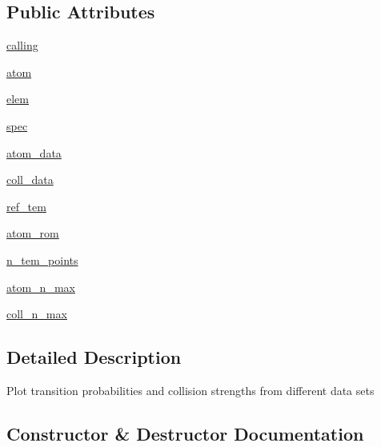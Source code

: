 \subsection*{Public Attributes}
\begin{DoxyCompactItemize}
\item 
\hyperlink{classpyneb_1_1plot_1_1plot_atomic_data_1_1_data_plot_ab25fa7ebe84b603684dee62410c1e34c}{calling}
\item 
\hyperlink{classpyneb_1_1plot_1_1plot_atomic_data_1_1_data_plot_a0c5c7091b1d8a95d9bee2744d713f5c9}{atom}
\item 
\hyperlink{classpyneb_1_1plot_1_1plot_atomic_data_1_1_data_plot_a62e73dc66c7aff7941c5ce94e808c23a}{elem}
\item 
\hyperlink{classpyneb_1_1plot_1_1plot_atomic_data_1_1_data_plot_adaf1b66faf18504ec4b5c8c0b7f6763b}{spec}
\item 
\hyperlink{classpyneb_1_1plot_1_1plot_atomic_data_1_1_data_plot_adbc6d7a21be11f88119d2df92b7669de}{atom\+\_\+data}
\item 
\hyperlink{classpyneb_1_1plot_1_1plot_atomic_data_1_1_data_plot_aa561ae44595ada3e8abc919e7eb658c6}{coll\+\_\+data}
\item 
\hyperlink{classpyneb_1_1plot_1_1plot_atomic_data_1_1_data_plot_a18c0d88f53a02c76deb40d357e3130d5}{ref\+\_\+tem}
\item 
\hyperlink{classpyneb_1_1plot_1_1plot_atomic_data_1_1_data_plot_a6bb4027912dbb4908acddc15fd10900c}{atom\+\_\+rom}
\item 
\hyperlink{classpyneb_1_1plot_1_1plot_atomic_data_1_1_data_plot_a173ab0637c9bd1f4f3bca204f5842e93}{n\+\_\+tem\+\_\+points}
\item 
\hyperlink{classpyneb_1_1plot_1_1plot_atomic_data_1_1_data_plot_a9d8384d6e40ef24c8b63f316c53e4c69}{atom\+\_\+n\+\_\+max}
\item 
\hyperlink{classpyneb_1_1plot_1_1plot_atomic_data_1_1_data_plot_a0c40e76d4f964382eb26f279b631c956}{coll\+\_\+n\+\_\+max}
\end{DoxyCompactItemize}


\subsection{Detailed Description}
\begin{DoxyVerb}Plot transition probabilities and collision strengths from different data sets\end{DoxyVerb}
 

\subsection{Constructor \& Destructor Documentation}
\hypertarget{classpyneb_1_1plot_1_1plot_atomic_data_1_1_data_plot_ac775ee34451fdfa742b318538164070e}{}

